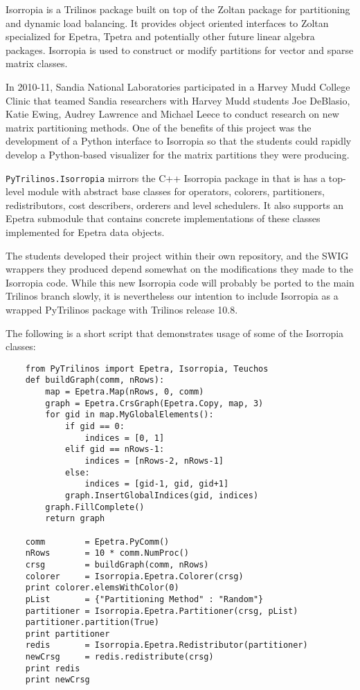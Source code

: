 \documentclass[11pt]{article}
\begin{document}
Isorropia is a Trilinos package built on top of the Zoltan package for partitioning and dynamic load balancing.  It provides object oriented interfaces to Zoltan specialized for Epetra, Tpetra and potentially other future linear algebra packages.  Isorropia is used to construct or modify partitions for vector and sparse matrix classes.

In 2010-11, Sandia National Laboratories participated in a Harvey Mudd College Clinic that teamed Sandia researchers with Harvey Mudd students Joe DeBlasio, Katie Ewing, Audrey Lawrence and Michael Leece to conduct research on new matrix partitioning methods.  One of the benefits of this project was the development of a Python interface to Isorropia so that the students could rapidly develop a Python-based visualizer for the matrix partitions they were producing.

{\tt PyTrilinos.Isorropia} mirrors the C++ Isorropia package in that is has a top-level module with abstract base classes for operators, colorers, partitioners, redistributors, cost describers, orderers and level schedulers.  It also supports an Epetra submodule that contains concrete implementations of these classes implemented for Epetra data objects.

The students developed their project within their own repository, and the SWIG wrappers they produced depend somewhat on the modifications they made to the Isorropia code.  While this new Isorropia code will probably be ported to the main Trilinos branch slowly, it is nevertheless our intention to include Isorropia as a wrapped PyTrilinos package with Trilinos release 10.8.

The following is a short script that demonstrates usage of some of the Isorropia classes:
\begin{verbatim}
    from PyTrilinos import Epetra, Isorropia, Teuchos
    def buildGraph(comm, nRows):
        map = Epetra.Map(nRows, 0, comm)
        graph = Epetra.CrsGraph(Epetra.Copy, map, 3)
        for gid in map.MyGlobalElements():
            if gid == 0:
                indices = [0, 1]
            elif gid == nRows-1:
                indices = [nRows-2, nRows-1]
            else:
                indices = [gid-1, gid, gid+1]
            graph.InsertGlobalIndices(gid, indices)
        graph.FillComplete()
        return graph

    comm        = Epetra.PyComm()
    nRows       = 10 * comm.NumProc()
    crsg        = buildGraph(comm, nRows)
    colorer     = Isorropia.Epetra.Colorer(crsg)
    print colorer.elemsWithColor(0)
    pList       = {"Partitioning Method" : "Random"}
    partitioner = Isorropia.Epetra.Partitioner(crsg, pList)
    partitioner.partition(True)
    print partitioner
    redis       = Isorropia.Epetra.Redistributor(partitioner)
    newCrsg     = redis.redistribute(crsg)
    print redis
    print newCrsg
\end{verbatim}
\end{document}
